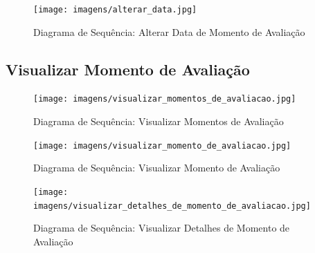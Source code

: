 \begin{figure}[!htbp]
\centering
\texttt{[image: imagens/alterar\_data.jpg]}
\caption{Diagrama de Sequência: Alterar Data de Momento de Avaliação}
\label{fig:alterar_data}
\end{figure}


\clearpage
\subsection{Visualizar Momento de Avaliação}

\begin{figure}[!htbp]
\centering
\texttt{[image: imagens/visualizar\_momentos\_de\_avaliacao.jpg]}
\caption{Diagrama de Sequência: Visualizar Momentos de Avaliação}
\label{fig:visualizar_momentos_de_avaliacao}
\end{figure}


\begin{figure}[!htbp]
\centering
\texttt{[image: imagens/visualizar\_momento\_de\_avaliacao.jpg]}
\caption{Diagrama de Sequência: Visualizar Momento de Avaliação}
\label{fig:visualizar_momento_de_avaliacao}
\end{figure}

\begin{figure}[!htbp]
\centering
\texttt{[image: imagens/visualizar\_detalhes\_de\_momento\_de\_avaliacao.jpg]}
\caption{Diagrama de Sequência: Visualizar Detalhes de Momento de Avaliação}
\label{fig:visualizar_detalhes_de_momento_de_avaliacao}
\end{figure}